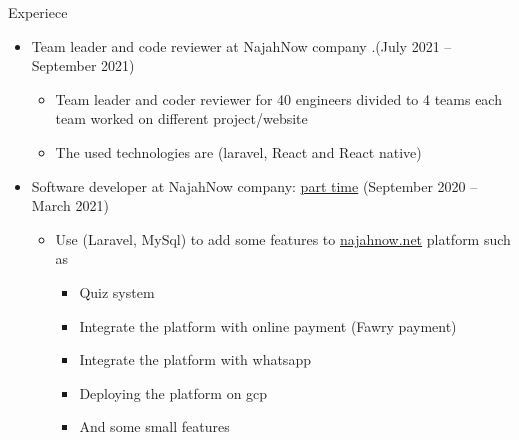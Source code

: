 \documentclass{resume}
\begin{document}
\begin{rSection}{Experiece}
    \begin{itemize}
        \item Team leader and code reviewer at NajahNow company  .\hfill{(July 2021 – September 2021)}
        \begin{itemize}
            \item Team leader and coder reviewer for 40 engineers divided to 4 teams each team worked on different project/website
            \item The used technologies are (laravel, React and React native)
        \end{itemize}
        
        \item Software developer at NajahNow company: \underline{part time} \hfill{(September 2020 – March 2021)}
        \begin{itemize}
            \item Use (Laravel, MySql) to add some features to \href{https://najahnow.net}{najahnow.net} platform such as 
            \begin{itemize}
                \item Quiz system 
                \item Integrate the platform with online payment (Fawry payment)
                \item Integrate the platform with whatsapp 
                \item Deploying the platform on gcp
                \item And some small features
            \end{itemize}
        \end{itemize}


\end{itemize}
\end{rSection}
\end{document}
